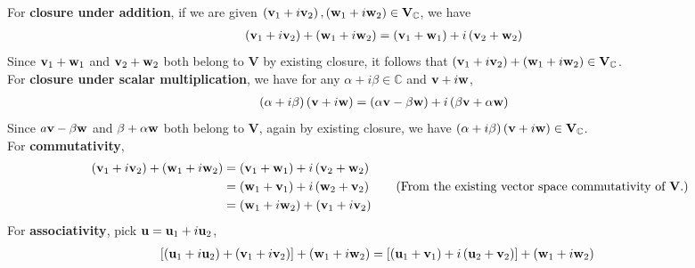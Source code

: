 \begin{solution} 
  For \textbf{closure under addition}, if we are given \(  \left( \vb{v}_{1} + i \vb{v}_{2} \right), \left( \vb{w}_{1} + i \vb{w}_{2} \right)  \in \mathbf{V}_{\mathbb{C}}\), we have 
  \begin{align*}
     \left( \vb{v}_{1} + i \vb{v}_{2} \right) + \left( \vb{w}_{1} + i \vb{w}_{2} \right) &=  \left( \vb{v}_{1} + \vb{w}_{1} \right) +i\left( \vb{v}_{2} + \vb{w}_{2} \right) 
  \end{align*}
  Since \( \vb{v}_{1} + \vb{w}_{1}\) and \( \vb{v}_{2} + \vb{w}_{2}\) both belong to \( \mathbf{V} \) by existing closure, it follows that \( \left( \vb{v}_{1} + i \vb{v}_{2} \right) + \left( \vb{w}_{1} + i \vb{w}_{2} \right)\in \mathbf{V}_{\mathbb{C}} \). \\
  For \textbf{closure under scalar multiplication}, we have for any \( \alpha +i \beta \in \mathbb{C} \) and \( \vb{v} + i \vb{w} \), 
  \begin{align*}
    \left( \alpha + i \beta \right) \left( \vb{v} + i \vb{w} \right) &= \left( \alpha \vb{v} - \beta \vb{w} \right) + i \left( \beta \vb{v} + \alpha \vb{w} \right)
  \end{align*}
  Since \( a \vb{v} - \beta \vb{w} \) and \( \beta + \alpha \vb{w} \) both belong to \( \mathbf{V} \), again by existing closure, we have \(  \left( \alpha + i \beta \right) \left( \vb{v} + i \vb{w} \right) \in \mathbf{V}_{\mathbb{C}} \). \\ 
  For \textbf{commutativity},  
  \begin{align*}
     \left( \vb{v}_{1} + i \vb{v}_{2} \right) + \left( \vb{w}_{1} + i \vb{w}_{2} \right) &= \left( \vb{v}_{1} + \vb{w}_{1} \right) + i \left( \vb{v}_{2} + \vb{w}_{2} \right) \\
     &= \left( \vb{w}_{1} + \vb{v}_{1} \right) + i \left( \vb{w}_{2} + \vb{v}_{2} \right) \tag{From the existing vector space commutativity of $\mathbf{V}$.} \\ 
     &=  \left( \vb{w}_{1} + i \vb{w}_{2} \right) +  \left( \vb{v}_{1} + i \vb{v}_{2} \right)
  \end{align*}
  For \textbf{associativity}, pick \( \vb{u} = \vb{u}_{1} + i \vb{u}_{2} \),
  \begin{align*}
   \hspace{-2em} \left[ \left(  \vb{u}_{1} + i \vb{u}_{2} \right)  +  \left( \vb{v}_{1} + i \vb{v}_{2} \right) \right] +  \left( \vb{w}_{1} + i \vb{w}_{2} \right) &= \left[ \left( \vb{u}_{1} +\vb{v}_{1} \right) + i \left( \vb{u}_{2} +\vb{v}_{2} \right) \right] + \left( \vb{w}_{1} + i \vb{w}_{2} \right) \\

\end{align*}
\end{solution}
